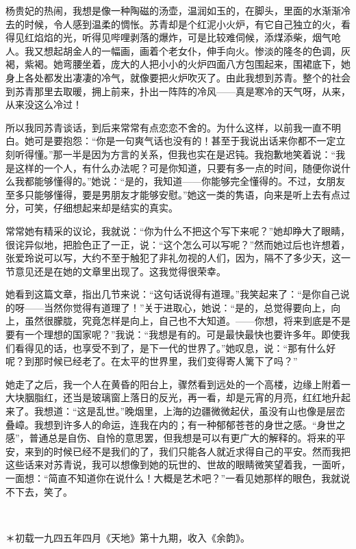 \par 杨贵妃的热闹，我想是像一种陶磁的汤壶，温润如玉的，在脚头，里面的水渐渐冷去的时候，令人感到温柔的惆怅。苏青却是个红泥小火炉，有它自己独立的火，看得见红焰焰的光，听得见哔哩剥落的爆炸，可是比较难伺候，添煤添柴，烟气呛人。我又想起胡金人的一幅画，画着个老女仆，伸手向火。惨淡的隆冬的色调，灰褐，紫褐。她弯腰坐着，庞大的人把小小的火炉四面八方包围起来，围裙底下，她身上各处都发出凄凄的冷气，就像要把火炉吹灭了。由此我想到苏青。整个的社会到苏青那里去取暖，拥上前来，扑出一阵阵的冷风——真是寒冷的天气呀，从来，从来没这么冷过！
\par 所以我同苏青谈话，到后来常常有点恋恋不舍的。为什么这样，以前我一直不明白。她可是要抱怨：“你是一句爽气话也没有的！甚至于我说出话来你都不一定立刻听得懂。”那一半是因为方言的关系，但我也实在是迟钝。我抱歉地笑着说：“我是这样的一个人，有什么办法呢？可是你知道，只要有多一点的时间，随便你说什么我都能够懂得的。”她说：“是的，我知道——你能够完全懂得的。不过，女朋友至多只能够懂得，要是男朋友才能够安慰。”她这一类的隽语，向来是听上去有点过分，可笑，仔细想起来却是结实的真实。
\par 常常她有精采的议论，我就说：“你为什么不把这个写下来呢？”她却睁大了眼睛，很诧异似地，把脸色正了一正，说：“这个怎么可以写呢？”然而她过后也许想着，张爱玲说可以写，大约不至于触犯了非礼勿视的人们，因为，隔不了多少天，这一节意见还是在她的文章里出现了。这我觉得很荣幸。
\par 她看到这篇文章，指出几节来说：“这句话说得有道理。”我笑起来了：“是你自己说的呀——当然你觉得有道理了！”关于进取心，她说：“是的，总觉得要向上，向上，虽然很朦胧，究竟怎样是向上，自己也不大知道。——你想，将来到底是不是要有一个理想的国家呢？”我说：“我想是有的。可是最快最快也要许多年。即使我们看得见的话，也享受不到了，是下一代的世界了。”她叹息，说：“那有什么好呢？到那时候已经老了。在太平的世界里，我们变得寄人篱下了吗？”
\par 她走了之后，我一个人在黄昏的阳台上，骤然看到远处的一个高楼，边缘上附着一大块胭脂红，还当是玻璃窗上落日的反光，再一看，却是元宵的月亮，红红地升起来了。我想道：“这是乱世。”晚烟里，上海的边疆微微起伏，虽没有山也像是层峦叠嶂。我想到许多人的命运，连我在内的；有一种郁郁苍苍的身世之感。“身世之感”，普通总是自伤、自怜的意思罢，但我想是可以有更广大的解释的。将来的平安，来到的时候已经不是我们的了，我们只能各人就近求得自己的平安。然而我把这些话来对苏青说，我可以想像到她的玩世的、世故的眼睛微笑望着我，一面听，一面想：“简直不知道你在说什么！大概是艺术吧？”一看见她那样的眼色，我就说不下去，笑了。
\par  
\par ＊初载一九四五年四月《天地》第十九期，收入《余韵》。


